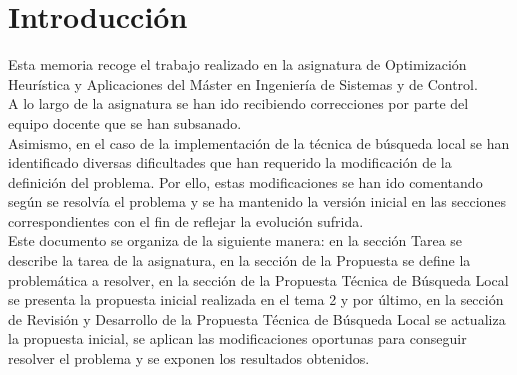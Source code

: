\section*{Introducción}

Esta memoria recoge el trabajo realizado en la asignatura de Optimización Heurística y Aplicaciones 
del Máster en Ingeniería de Sistemas y de Control. \\

A lo largo de la asignatura se han ido recibiendo correcciones por parte del equipo docente 
que se han subsanado.\\

Asimismo, en el caso de la implementación de la técnica de búsqueda
local se han identificado diversas dificultades que han requerido la modificación
de la definición del problema. Por ello, estas modificaciones se han ido comentando según se
resolvía el problema y se ha mantenido la versión inicial en las secciones correspondientes
con el fin de reflejar la evolución sufrida. \\

Este documento se organiza de la siguiente manera: en la sección Tarea se 
describe la tarea de la asignatura, en la sección de la Propuesta
se define la problemática a resolver, en la sección de la Propuesta Técnica
de Búsqueda Local se presenta la propuesta inicial realizada en el tema 2 y 
por último, en la sección de Revisión y Desarrollo de la Propuesta Técnica de Búsqueda
Local se actualiza la propuesta inicial, se aplican las modificaciones oportunas
para conseguir resolver el problema y se exponen los resultados obtenidos.